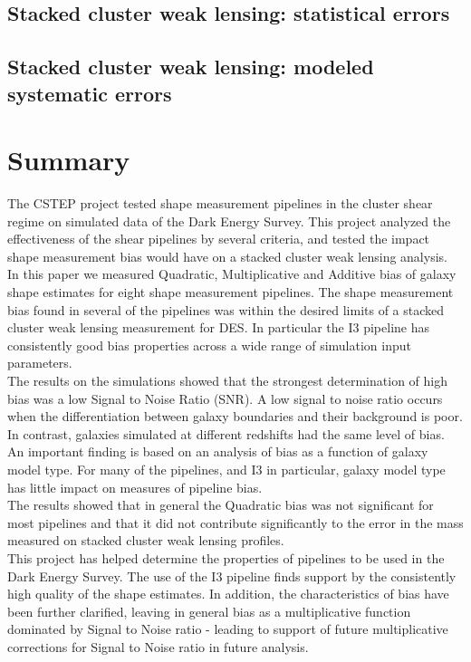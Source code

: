 \documentclass[useAMS,usenatbib]{mn2e}
\begin{document}
\subsection{Stacked cluster weak lensing: statistical errors}\label{sec:p1}


\subsection{Stacked cluster weak lensing: modeled systematic errors}\label{sec:p2}


\section{Summary}
The CSTEP project tested shape measurement pipelines in the cluster
shear regime on simulated data of the Dark Energy Survey. This project
analyzed the effectiveness of the shear pipelines by several criteria,
and tested the impact shape measurement bias would have on a stacked
cluster weak lensing analysis. \\
\indent In this paper we measured Quadratic, Multiplicative and
Additive bias of galaxy shape estimates for eight shape measurement
pipelines. The shape measurement bias found in several of the pipelines was within the
desired limits of a stacked cluster weak lensing measurement for
DES. In particular the I3 pipeline has consistently good bias properties
across a wide range of simulation input parameters.\\
\indent The results on the simulations showed that the strongest
determination of high bias was a low Signal to Noise Ratio (SNR). A
low signal to noise ratio occurs when the differentiation between
galaxy boundaries and their background is poor. In contrast, galaxies 
simulated at different redshifts had the same level of bias. An
important finding is based on an analysis of bias as a function of galaxy model
type. For many of the pipelines, and I3 in particular, galaxy
model type has little impact on measures of pipeline bias. \\
\indent The results showed that in general the Quadratic bias was not
significant for most pipelines and that it did not contribute
significantly to the error in the mass measured on stacked cluster
weak lensing profiles. \\
\indent This project has helped determine the properties of pipelines
to be used in the Dark Energy Survey. The use of the I3 pipeline
finds support by the consistently high quality of the shape
estimates. In addition, the characteristics of bias have been further
clarified, leaving in general bias as a multiplicative function
dominated by Signal to Noise ratio - leading to support of future
multiplicative corrections for Signal to Noise ratio in future
analysis. \\
\end{document}
